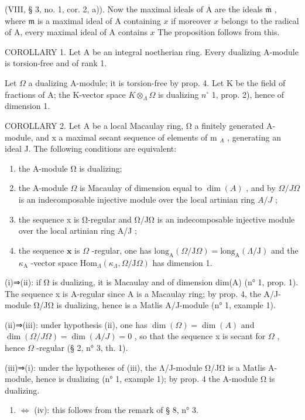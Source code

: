 (VIII, § 3, no. 1, cor. 2, a)). Now the maximal ideals of \(\overline{\mathrm{A}}\) are the ideals \(\overline{\mathfrak{m}}\) , where \(\mathfrak{m}\) is a maximal ideal of A containing \(x\) if moreover \(x\) belongs to the radical of A, every maximal ideal of A contains \(x\) The proposition follows from this.

COROLLARY 1. Let A be an integral noetherian ring. Every dualizing A-module is torsion-free and of rank 1.

Let \(\Omega\) a dualizing A-module; it is torsion-free by prop. 4. Let K be the field of fractions of A; the K-vector space \(K \otimes_{\Lambda} \Omega\) is dualizing \(n^{\circ}\) 1, prop. 2), hence of dimension 1.

COROLLARY 2. Let A be a local Macaulay ring, Ω a finitely generated A-module, and x a maximal secant sequence of elements of m \(_{A}\) , generating an ideal J. The following conditions are equivalent:

\begin{enumerate}
\def\labelenumi{(\roman{enumi})}
\item
  the A-module Ω is dualizing;
\item
  the A-module \(\Omega\) is Macaulay of dimension equal to \(\dim(A)\) , and by \(\Omega/J\Omega\) is an indecomposable injective module over the local artinian ring \(A/J\) ;
\item
  the sequence x is Ω-regular and Ω/JΩ is an indecomposable injective module over the local artinian ring A/J ;
\item
  the sequence \(\mathbf{x}\) is \(\Omega\) -regular, one has \(\mathrm{long}_{\mathrm{A}}(\Omega/\mathrm{J}\Omega) = \mathrm{long}_{\mathrm{A}}(\Lambda/\mathrm{J})\) and the \(\kappa_{\mathrm{A}}\) -vector space \(\mathrm{Hom}_{\Lambda}(\kappa_{\Lambda}, \Omega/\mathrm{J}\Omega)\) has dimension 1.
\end{enumerate}

(i)⇒(ii): if Ω is dualizing, it is Macaulay and of dimension dim(A) (n° 1, prop. 1). The sequence x is A-regular since A is a Macaulay ring; by prop. 4, the A/J-module Ω/JΩ is dualizing, hence is a Matlis A/J-module (n° 1, example 1).

(ii)⇒(iii): under hypothesis (ii), one has \(\dim(\Omega)=\dim(A)\) and \(\dim(\Omega/J\Omega)=\dim(A/J)=0\) , so that the sequence x is secant for \(\Omega\) , hence \(\Omega\) -regular (§ 2, n° 3, th. 1).

(iii)⇒(i): under the hypotheses of (iii), the Λ/J-module Ω/JΩ is a Matlis A-module, hence is dualizing (n° 1, example 1); by prop. 4 the A-module Ω is dualizing.

\begin{enumerate}
\def\labelenumi{(\roman{enumi})}
\setcounter{enumi}{2}
\tightlist
\item
  \(\Leftrightarrow\) (iv): this follows from the remark of § 8, n° 3.
\end{enumerate}

